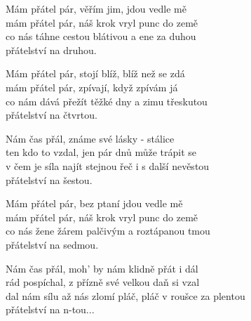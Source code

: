 
\ve{}
Mám přátel pár, věřím jim, jdou vedle mě\\
mám přátel pár, náš krok vryl punc do země\\
co nás táhne cestou blátivou a ene za duhou\\
přátelství na druhou.

\ve{}
Mám přátel pár, stojí blíž, blíž než se zdá\\
mám přátel pár, zpívají, když zpívám já\\
co nám dává přežít těžké dny a zimu třeskutou\\
přátelství na čtvrtou.

\cho{}
Nám čas přál, známe své lásky - stálice\\
ten kdo to vzdal, jen pár dnů může trápit se\\
v čem je síla najít stejnou řeč i s další nevěstou\\
přátelství na šestou.

\ve{}
Mám přátel pár, bez ptaní jdou vedle mě\\
mám přátel pár, náš krok vryl punc do země\\
co nás žene žárem palčivým a roztápanou tmou\\
přátelství na sedmou.

\cho{}
Nám čas přál, moh' by nám klidně přát i dál\\
rád pospíchal, z přízně své velkou daň si vzal\\
dal nám sílu až nás zlomí pláč, pláč v roušce za plentou\\
přátelství na n-tou...



\esong{}